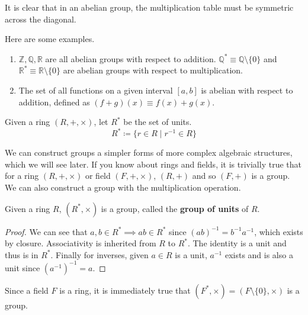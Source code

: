   It is clear that in an abelian group, the multiplication table must be symmetric across the diagonal. 

  \begin{example}
    Here are some examples. 
    \begin{enumerate}
      \item $\mathbb{Z}, \mathbb{Q}, \mathbb{R}$ are all abelian groups with respect to addition. $\mathbb{Q}^{*} \equiv \mathbb{Q} \setminus \{0\}$ and $\mathbb{R}^{*} \equiv \mathbb{R} \setminus \{0\}$ are abelian groups with respect to multiplication.
      \item The set of all functions on a given interval $[a,b]$ is abelian with respect to addition, defined as $(f+g)(x) \equiv f(x) + g(x)$. 
    \end{enumerate}
  \end{example} 

  \begin{definition}
    Given a ring $(R, +, \times)$, let $R^\ast$ be the set of units. 
    \begin{equation}
      R^\ast \coloneqq \{r \in R \mid r^{-1} \in R\}
    \end{equation}
  \end{definition} 

  We can construct groups a simpler forms of more complex algebraic structures, which we will see later. If you know about rings and fields, it is trivially true that for a ring $(R, +, \times)$ or field $(F, +, \times)$, $(R, +)$ and so $(F, +)$ is a group. We can also construct a group with the multiplication operation. 

  \begin{theorem}
    Given a ring $R$, $(R^\ast, \times)$ is a group, called the \textbf{group of units} of $R$. 
  \end{theorem}
  \begin{proof}
    We can see that $a, b \in R^\ast \implies ab \in R^\ast$ since $(ab)^{-1} = b^{-1} a^{-1}$, which exists by closure. Associativity is inherited from $R$ to $R^\ast$. The identity is a unit and thus is in $R^\ast$. Finally for inverses, given $a \in R$ is a unit, $a^{-1}$ exists and is also a unit since $(a^{-1})^{-1} = a$. 
  \end{proof}

  Since a field $F$ is a ring, it is immediately true that $(F^\ast, \times) = (F \setminus \{0\}, \times)$ is a group. 

